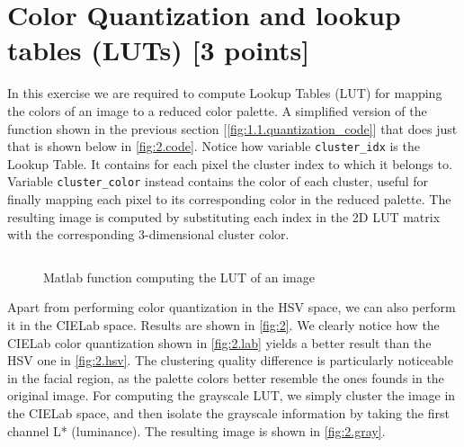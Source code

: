 \documentclass[tikz,14pt,fleqn]{article}
\begin{document}
\section{Color Quantization and lookup tables (LUTs) [3 points]}
In this exercise we are required to compute Lookup Tables (LUT) for mapping the colors of an image to a reduced color palette. A simplified version of the function shown in the previous section [\autoref{fig:1.1.quantization_code}] that does just that is shown below in \autoref{fig:2.code}. Notice how variable \verb|cluster_idx| is the Lookup Table. It contains for each pixel the cluster index to which it belongs to. Variable \verb|cluster_color| instead contains the color of each cluster, useful for finally mapping each pixel to its corresponding color in the reduced palette. The resulting image is computed by substituting each index in the 2D LUT matrix with the corresponding 3-dimensional cluster color.
\begin{figure}[h!]
    \vspace*{-0.2cm}
    \inputminted[firstline=37, frame=lines, framesep=2mm, fontsize=\small ]{matlab}{../src/ex2.m}
    \vspace*{-0.5cm}
    \caption{\small Matlab function computing the LUT of an image}
    \label{fig:2.code}
\end{figure}
Apart from performing color quantization in the HSV space, we can also perform it in the CIELab space. Results are shown in \autoref{fig:2}. We clearly notice how the CIELab color quantization shown in \autoref{fig:2.lab} yields a better result than the HSV one in \autoref{fig:2.hsv}. The clustering quality difference is particularly noticeable in the facial region, as the palette colors better resemble the ones founds in the original image. For computing the grayscale LUT, we simply cluster the image in the CIELab space, and then isolate the grayscale information by taking the first channel L* (luminance). The resulting image is shown in \autoref{fig:2.gray}.
\end{document}
